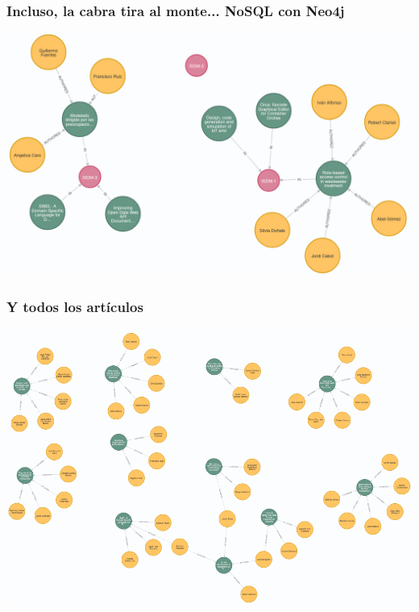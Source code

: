 \begin{frame}
  \frametitle{Incluso, la cabra tira al monte... NoSQL con Neo4j}
  \centering\includegraphics[height=.9\textheight]{img/sessions}
\end{frame}



\begin{frame}
  \frametitle{Y todos los artículos}
\centering\includegraphics[height=.9\textheight]{img/papers}
\end{frame}








